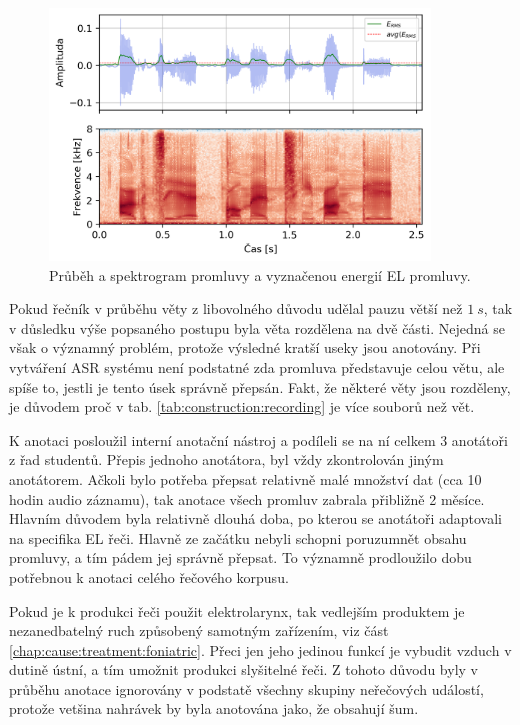 \begin{figure}[hbpt]
  \centering
  \includegraphics[width=0.9\textwidth]{./ch5-construction/img/energy_spec_el.png}
  \caption{Průběh a spektrogram promluvy a vyznačenou energií EL promluvy.}
  \label{fig:construction:el_speech}
\end{figure}

Pokud řečník v průběhu věty z libovolného důvodu udělal pauzu větší než $1\ s$, tak v důsledku výše popsaného postupu byla věta rozdělena na dvě části. Nejedná se však o významný problém, protože výsledné kratší useky jsou anotovány. Při vytváření ASR systému není podstatné zda promluva představuje celou větu, ale spíše to, jestli je tento úsek správně přepsán. Fakt, že některé věty jsou rozděleny, je důvodem proč v tab. \ref{tab:construction:recording} je více souborů než vět.

K anotaci posloužil interní anotační nástroj a podíleli se na ní celkem 3 anotátoři z řad studentů. Přepis jednoho anotátora, byl vždy zkontrolován jiným anotátorem. Ačkoli bylo potřeba přepsat relativně malé množství dat (cca 10 hodin audio záznamu), tak anotace všech promluv zabrala přibližně 2 měsíce. Hlavním důvodem byla relativně dlouhá doba, po kterou se anotátoři adaptovali na specifika EL řeči. Hlavně ze začátku nebyli schopni poruzumnět obsahu promluvy, a tím pádem jej správně přepsat. To významně prodloužilo dobu potřebnou k anotaci celého řečového korpusu.

Pokud je k produkci řeči použit elektrolarynx, tak vedlejším produktem je nezanedbatelný ruch způsobený samotným zařízením, viz část \ref{chap:cause:treatment:foniatric}. Přeci jen jeho jedinou funkcí je vybudit vzduch v dutině ústní, a tím umožnit produkci slyšitelné řeči. Z tohoto důvodu byly v průběhu anotace ignorovány v podstatě všechny skupiny neřečových událostí, protože vetšina nahrávek by byla anotována jako, že obsahují šum.

